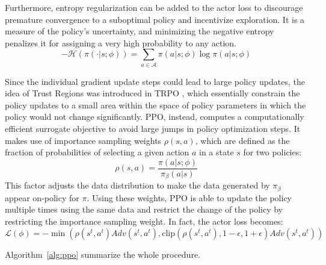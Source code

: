 Furthermore, entropy regularization can be added to the actor loss to discourage premature convergence to a suboptimal policy and incentivize exploration. 
It is a measure of the policy's uncertainty, and minimizing the negative entropy penalizes it for assigning a very high probability to any action.
\begin{equation}
    -\mathcal{H}(\pi(\cdot|s;\phi)) = \sum_{a\in\mathcal{A}}\pi(a|s;\phi)\log\pi(a|s;\phi)
\end{equation}

Since the individual gradient update steps could lead to large policy updates, the idea of Trust Regions was introduced in TRPO \cite{schulman2015trpo}, which 
essentially constrain the policy updates to a small area within the space of policy parameters in which the policy would not change significantly. 
PPO, instead, computes a computationally efficient surrogate objective to avoid large jumps in policy optimization steps. It makes use of importance sampling weights $\rho(s,a)$, which are defined
as the fraction of probabilities of selecting a given action $a$ in a state $s$ for two policies:
\begin{equation}
    \rho(s,a) = \frac{\pi(a|s;\phi)}{\pi_{\beta}(a|s)}
\end{equation}
This factor adjusts the data distribution to make the data generated by $\pi_{\beta}$ appear on-policy for $\pi$. Using these weights, PPO is able to update the policy multiple times using the same data and restrict the change of the policy by restricting the importance sampling weight.
In fact, the actor loss becomes:
\begin{equation}
    \mathcal{L}(\phi) = -\min \left(\rho(s^t,a^t)Adv(s^t,a^t), \text{clip}(\rho(s^t,a^t),1-\epsilon,1+\epsilon)Adv(s^t,a^t)\right)
\end{equation}

Algorithm~\ref{alg:ppo} summarize the whole procedure.

